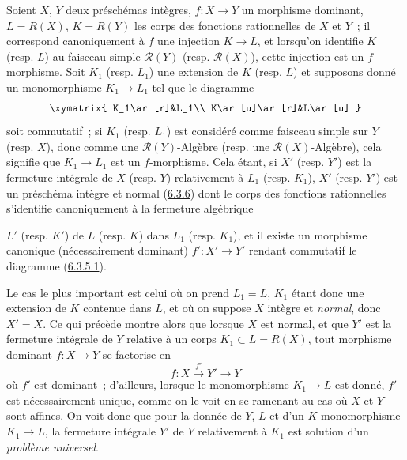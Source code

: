\begin{env}[6.3.9]
\label{II.6.3.9-fr}
Soient $X$, $Y$ deux préschémas intègres, $f:X\to Y$ un morphisme dominant,
$L=R(X)$, $K=R(Y)$ les corps des fonctions rationnelles de $X$ et $Y$~; il
correspond canoniquement à $f$ une injection $K\to L$, et lorsqu'on identifie
$K$ (resp. $L$) au faisceau simple $\mathcal{R}(Y)$ (resp.
$\mathcal{R}(X)$), cette injection est un $f$-morphisme. Soit $K_1$ (resp.
$L_1$) une extension de $K$ (resp. $L$) et supposons donné un monomorphisme
$K_1\to L_1$ tel que le diagramme
\[
\xymatrix{
K_1\ar[r]&L_1\\
K\ar[u]\ar[r]&L\ar[u]
}
\]
soit commutatif~; si $K_1$ (resp. $L_1$) est considéré comme faisceau simple
sur $Y$ (resp. $X$), donc comme une $\mathcal{R}(Y)$-Algèbre (resp. une
$\mathcal{R}(X)$-Algèbre), cela signifie que $K_1\to L_1$ est un
$f$-morphisme. Cela étant, si $X'$ (resp. $Y'$) est la fermeture intégrale de
$X$ (resp. $Y$) relativement à $L_1$ (resp. $K_1$), $X'$ (resp. $Y'$) est un
préschéma intègre et normal (\hyperref[II.6.3.6-fr]{6.3.6}) dont le corps des
fonctions rationnelles s'identifie canoniquement à la fermeture algébrique


$L'$ (resp. $K'$) de $L$ (resp. $K$) dans $L_1$ (resp. $K_1$), et il existe
un morphisme canonique (nécessairement dominant) $f':X'\to Y'$ rendant
commutatif le diagramme (\hyperref[II.6.3.5.1-fr]{6.3.5.1}).

Le cas le plus important est celui où on prend $L_1=L$, $K_1$ étant donc une
extension de $K$ contenue dans $L$, et où on suppose $X$ intègre et
\emph{normal}, donc $X'=X$. Ce qui précède montre alors que lorsque $X$ est
normal, et que $Y'$ est la fermeture intégrale de $Y$ relative à un corps
$K_1\subset L=R(X)$, tout morphisme dominant $f:X\to Y$ se factorise en
\[
f:X\xrightarrow{f'}Y'\to Y
\]
où $f'$ est dominant~; d'ailleurs, lorsque le monomorphisme $K_1\to L$ est
donné, $f'$ est nécessairement unique, comme on le voit en se ramenant au cas
où $X$ et $Y$ sont affines. On voit donc que pour la donnée de $Y$, $L$ et
d'un $K$-monomorphisme $K_1\to L$, la fermeture intégrale $Y'$ de $Y$
relativement à $K_1$ est solution d'un \emph{problème universel}.
\end{env}

